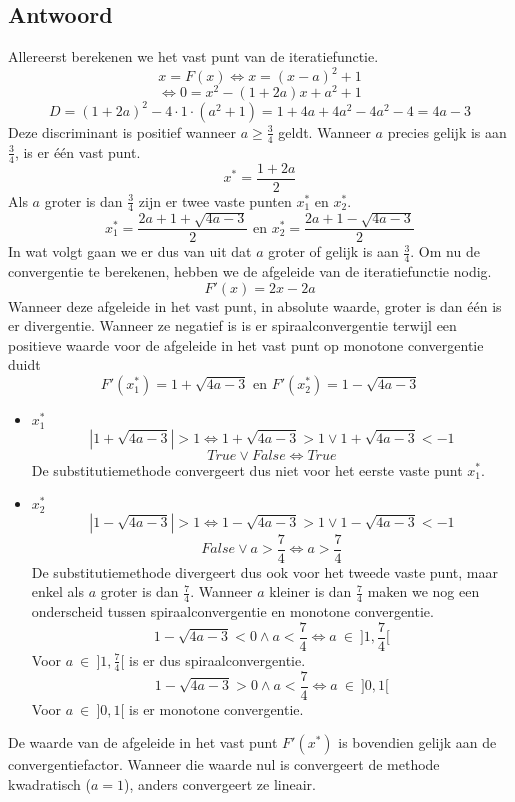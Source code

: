 \documentclass[examenvragen.tex]{subfiles}
\begin{document}
\subsection{Antwoord}
Allereerst berekenen we het vast punt van de iteratiefunctie.
\[
x = F(x) \Leftrightarrow x = (x-a)^2+1
\]
\[
\Leftrightarrow 0 = x^2-(1+2a)x+a^2+1
\]
\[
D = (1+2a)^2 - 4\cdot1\cdot(a^2+1) = 1+4a+4a^2-4a^2-4 = 4a-3
\]
Deze discriminant is positief wanneer $a \ge \frac{3}{4}$ geldt. 
Wanneer $a$ precies gelijk is aan $\frac{3}{4}$, is er \'e\'en vast punt.
\[
x^{*} = \frac{1+2a}{2}
\]
Als $a$ groter is dan $\frac{3}{4}$ zijn er twee vaste punten $x^{*}_{1}$ en $x^{*}_{2}$.
\[
x^{*}_1 = \frac{2a+1 +\sqrt{4a-3}}{2} \text{ en } x^{*}_{2}= \frac{2a+1 -\sqrt{4a-3}}{2}
\]
In wat volgt gaan we er dus van uit dat $a$ groter of gelijk is aan $\frac{3}{4}$.
Om nu de convergentie te berekenen, hebben we de afgeleide van de iteratiefunctie nodig.
\[
F'(x) = 2x-2a
\]
Wanneer deze afgeleide in het vast punt, in absolute waarde, groter is dan \'e\'en is er divergentie. Wanneer ze negatief is is er spiraalconvergentie terwijl een positieve waarde voor de afgeleide in het vast punt op monotone convergentie duidt
\[
F'(x^{*}_1) = 1 +  \sqrt{4a-3} \text{ en } F'(x^{*}_2) = 1-\sqrt{4a-3}
\]
\begin{itemize}
\item $x_{1}^{*}$
\[
|1 + \sqrt{4a-3}| > 1 \Leftrightarrow 1 + \sqrt{4a-3} > 1 \vee  1 + \sqrt{4a-3} < -1
\]
\[
True \vee False \Leftrightarrow True
\]
De substitutiemethode convergeert dus niet voor het eerste vaste punt $x_1^{*}$.
\item $x_{2}^{*}$
\[
|1-\sqrt{4a-3}| > 1 \Leftrightarrow  1-\sqrt{4a-3} > 1 \vee 1-\sqrt{4a-3} <-1
\]
\[
False \vee a > \frac{7}{4} \Leftrightarrow a > \frac{7}{4}
\]
De substitutiemethode divergeert dus ook voor het tweede vaste punt, maar enkel als $a$ groter is dan $\frac{7}{4}$.
Wanneer $a$ kleiner is dan $\frac{7}{4}$ maken we nog een onderscheid tussen spiraalconvergentie en monotone convergentie.
\[
1-\sqrt{4a-3} < 0 \wedge a < \frac{7}{4} \Leftrightarrow a\ \in\  ]1,\frac{7}{4}[
\]
Voor $a\ \in\ ]1,\frac{7}{4}[$ is er dus spiraalconvergentie.
\[
1-\sqrt{4a-3} > 0 \wedge a < \frac{7}{4} \Leftrightarrow a\ \in\ ]0,1[
\]
Voor $a\ \in\ ]0,1[$ is er monotone convergentie.
\end{itemize}
De waarde van de afgeleide in het vast punt $F'(x^*)$ is bovendien gelijk aan de convergentiefactor. Wanneer die waarde nul is convergeert de methode kwadratisch ($a = 1$), anders convergeert ze lineair.
\end{document}
